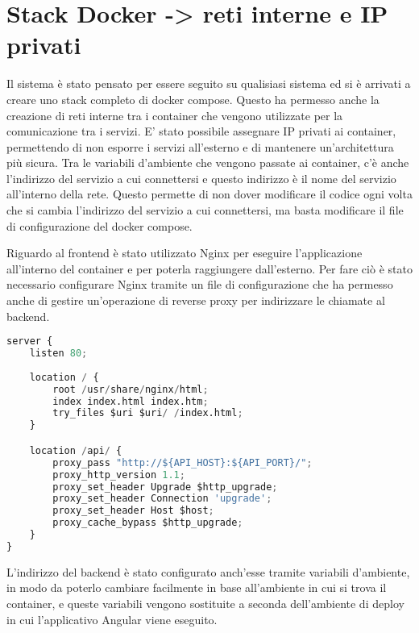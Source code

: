 \section{Stack Docker -> reti interne e IP privati}

Il sistema è stato pensato per essere seguito su qualisiasi sistema  ed   si  è arrivati a creare uno stack completo di docker compose. Questo ha permesso anche la creazione di reti interne tra i container che 
vengono utilizzate per la comunicazione tra i servizi. E' stato possibile assegnare IP privati ai container, permettendo di non esporre i servizi all'esterno e di mantenere un'architettura più sicura. Tra le 
variabili d'ambiente che vengono passate ai container, c'è anche l'indirizzo del servizio a cui connettersi e questo indirizzo è il nome del servizio all'interno della rete. Questo permette di non dover 
modificare il codice ogni volta che si cambia l'indirizzo del servizio a cui connettersi, ma basta modificare il file di configurazione del docker compose.

Riguardo al frontend è stato utilizzato Nginx per eseguire l'applicazione all'interno del container e per poterla raggiungere dall'esterno. 
Per fare ciò è stato necessario configurare Nginx tramite un file di configurazione che ha permesso anche di gestire un'operazione di reverse proxy per indirizzare le chiamate al backend.

\begin{lstlisting}[language=Python, caption={Configurazione Nginx del front-end}, label=list:nginx_frontend]
server {
    listen 80;
    
    location / {
        root /usr/share/nginx/html;
        index index.html index.htm;
        try_files $uri $uri/ /index.html;
    }

    location /api/ {
        proxy_pass "http://${API_HOST}:${API_PORT}/";
        proxy_http_version 1.1;
        proxy_set_header Upgrade $http_upgrade;
        proxy_set_header Connection 'upgrade';
        proxy_set_header Host $host;
        proxy_cache_bypass $http_upgrade;
    }
}
\end{lstlisting}

L'indirizzo del backend è stato configurato anch'esse tramite variabili d'ambiente, in modo da poterlo cambiare facilmente in base all'ambiente in cui si trova il container, e queste variabili vengono sostituite a seconda dell'ambiente di deploy in cui l'applicativo Angular viene eseguito.




